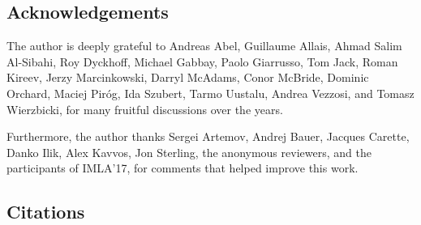 \documentclass{entcs}
\newcommand{\lambdabox}{\lambda^{\mkern-1mu\sq\mkern-2mu}}
\newcommand{\tsf}[1]{\textsf{\upshape{#1}}}
\newcommand{\stsf}[1]{\tsf{\small{#1}}}
\renewcommand{\:}{\mathrel{:}}
\renewcommand{\;}{\mathbin{;}}
\newcommand{\0}{\varnothing}
\newcommand{\R}{\Rightarrow}
\newcommand{\sq}{\Box}
\renewcommand{\e}{\mathrel{\vdash}}
\newcommand{\lam}{\operatorname{\lambda}}
\newcommand{\app}{\mathbin{\$}}
\newcommand{\quo}[1]{\mathopen{\ulcorner}{#1}\mathclose{\urcorner}}
\newcommand{\unq}[1]{\mathopen{\llcorner}{#1}\mathclose{\lrcorner}\,}
\newcommand{\mvO}{\operatorname{^{\stsf{mv}\mkern-1mu}\tsf{0}}}
\newcommand{\mvI}{\operatorname{^{\stsf{mv}\mkern-1mu}\tsf{1}}}
\newcommand{\vO}{\operatorname{^{\stsf{v}\mkern-1mu}\tsf{0}}}
\newcommand{\vI}{\operatorname{^{\stsf{v}\mkern-1mu}\tsf{1}}}
\begin{document}
%
%
%




\subsection*{Acknowledgements}

The author is deeply grateful to Andreas Abel, Guillaume Allais, Ahmad Salim Al-Sibahi, Roy Dyckhoff, Michael Gabbay, Paolo Giarrusso, Tom Jack, Roman Kireev, Jerzy Marcinkowski, Darryl McAdams, Conor McBride, Dominic Orchard, Maciej Pir\'{o}g, Ida Szubert, Tarmo Uustalu, Andrea Vezzosi, and Tomasz Wierzbicki, for many fruitful discussions over the years.

Furthermore, the author thanks Sergei Artemov, Andrej Bauer, Jacques Carette, Danko Ilik, Alex Kavvos, Jon Sterling, the anonymous reviewers, and the participants of IMLA'17, for comments that helped improve this work.




\subsection*{Citations}
\end{document}
